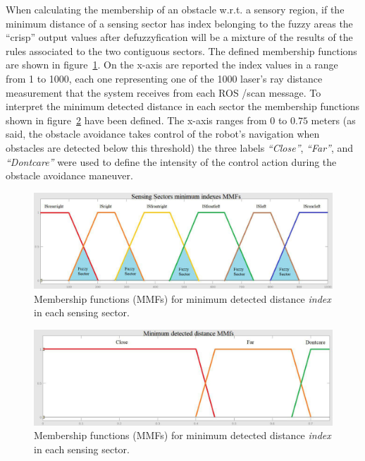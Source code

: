 When calculating the membership of an obstacle w.r.t. a sensory region, if the minimum distance of a sensing sector has index belonging to the fuzzy areas %
the ``crisp'' output values after defuzzyfication will be a mixture of the results of the rules associated to the two contiguous sectors. The defined membership functions are shown in figure~\ref{indexesmmf}. On the x-axis are reported the index values in a range from 1 to 1000, each one representing one of the 1000 laser's ray distance measurement that the system receives from each ROS /scan message.
To interpret the minimum detected distance in each sector the membership functions shown in figure~\ref{minmmf} have been defined. The x-axis ranges from 0 to $0.75$ meters (as said, the obstacle avoidance takes control of the robot's navigation when obstacles are detected below this threshold) the three labels \textit{``Close''}, \textit{``Far''}, and \textit{``Dontcare''} were used to define the intensity of the control action during the obstacle avoidance maneuver.

\begin{figure}[H]
	\centering
	\includegraphics[width=\textwidth]{images/03-foundation/indexesmmf}
	\caption{Membership functions (MMFs) for minimum detected distance \textit{index} in each sensing sector.} %
	\label{indexesmmf} 
\end{figure}
\begin{figure}[H]
	\centering
	\includegraphics[width=\textwidth]{images/03-foundation/minmmf}
	\caption{Membership functions (MMFs) for minimum detected distance \textit{index} in each sensing sector.}
	\label{minmmf} 
\end{figure}

